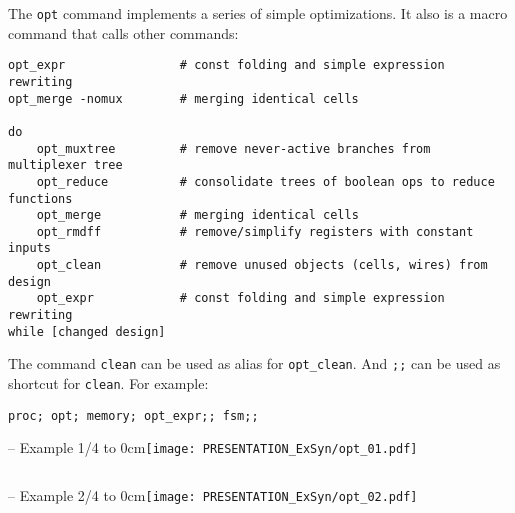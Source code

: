 \begin{frame}[fragile]{\subsecname}
The {\tt opt} command implements a series of simple optimizations. It also
is a macro command that calls other commands:

\begin{lstlisting}[xleftmargin=0.5cm, basicstyle=\ttfamily\fontsize{8pt}{10pt}\selectfont, language=ys]
opt_expr                # const folding and simple expression rewriting
opt_merge -nomux        # merging identical cells

do
    opt_muxtree         # remove never-active branches from multiplexer tree
    opt_reduce          # consolidate trees of boolean ops to reduce functions
    opt_merge           # merging identical cells
    opt_rmdff           # remove/simplify registers with constant inputs
    opt_clean           # remove unused objects (cells, wires) from design
    opt_expr            # const folding and simple expression rewriting
while [changed design]
\end{lstlisting}

The command {\tt clean} can be used as alias for {\tt opt\_clean}. And {\tt ;;}
can be used as shortcut for {\tt clean}. For example:

\begin{lstlisting}[xleftmargin=0.5cm, basicstyle=\ttfamily\fontsize{8pt}{10pt}\selectfont, language=ys]
proc; opt; memory; opt_expr;; fsm;;
\end{lstlisting}
\end{frame}

\begin{frame}[t, fragile]{\subsecname{} -- Example 1/4}
\vbox to 0cm{\texttt{[image: PRESENTATION\_ExSyn/opt\_01.pdf]}\vss}
\vskip-1cm
\begin{columns}
\column[t]{5cm}

\column[t]{5cm}

\end{columns}
\end{frame}

\begin{frame}[t, fragile]{\subsecname{} -- Example 2/4}
\vbox to 0cm{\texttt{[image: PRESENTATION\_ExSyn/opt\_02.pdf]}\vss}
\vskip-1cm
\begin{columns}
\column[t]{5cm}

\column[t]{5cm}

\end{columns}
\end{frame}

